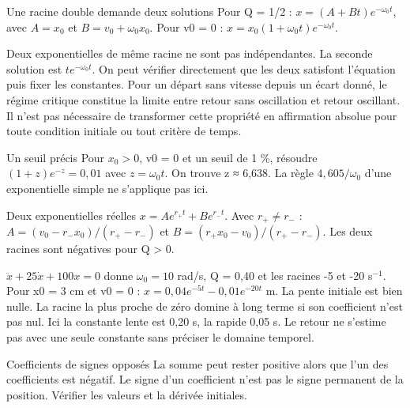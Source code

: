 \begin{loi}{Une racine double demande deux solutions}
Pour Q = 1/2 : $x=(A+Bt)e^{-\omega_0t}$, avec $A=x_0$ et $B=v_0+\omega_0x_0$. Pour v0 = 0 : $x=x_0(1+\omega_0t)e^{-\omega_0t}$.
\end{loi}
Deux exponentielles de même racine ne sont pas indépendantes. La seconde solution est $te^{-\omega_0t}$. On peut vérifier directement que les deux satisfont l’équation puis fixer les constantes.
Pour un départ sans vitesse depuis un écart donné, le régime critique constitue la limite entre retour sans oscillation et retour oscillant. Il n’est pas nécessaire de transformer cette propriété en affirmation absolue pour toute condition initiale ou tout critère de temps.
\begin{methode}{Un seuil précis}
Pour $x_0>0$, v0 = 0 et un seuil de 1 \%, résoudre $(1+z)e^{-z}=0{,}01$ avec $z=\omega_0t$. On trouve z ≈ 6,638. La règle $4{,}605/\omega_0$ d’une exponentielle simple ne s’applique pas ici.
\end{methode}


\begin{loi}{Deux exponentielles réelles}
$x=Ae^{r_+t}+Be^{r_-t}$. Avec $r_+\ne r_-$ : $A=(v_0-r_-x_0)/(r_+-r_-)$ et $B=(r_+x_0-v_0)/(r_+-r_-)$. Les deux racines sont négatives pour Q > 0.
\end{loi}
$\ddot x+25\dot x+100x=0$ donne $\omega_0=10$ rad/s, Q = 0,40 et les racines -5 et -20 s$^{-1}$. Pour x0 = 3 cm et v0 = 0 : $x=0{,}04e^{-5t}-0{,}01e^{-20t}$ m. La pente initiale est bien nulle.
La racine la plus proche de zéro domine à long terme si son coefficient n’est pas nul. Ici la constante lente est 0,20 s, la rapide 0,05 s. Le retour ne s’estime pas avec une seule constante sans préciser le domaine temporel.
\begin{piege}{Coefficients de signes opposés}
La somme peut rester positive alors que l’un des coefficients est négatif. Le signe d’un coefficient n’est pas le signe permanent de la position. Vérifier les valeurs et la dérivée initiales.
\end{piege}


